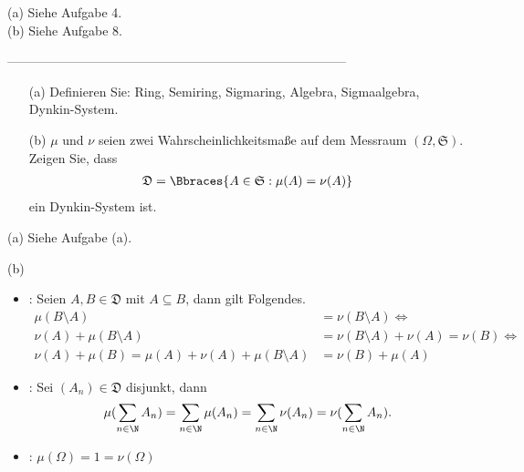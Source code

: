 \begin{solution}

(a) Siehe Aufgabe 4. \\

(b) Siehe Aufgabe 8.

\end{solution}

--------------------------------------------------------------------------------

\begin{exercise}

\begin{itemize}
  \item[(a)] Definieren Sie: Ring, Semiring, Sigmaring, Algebra, Sigmaalgebra, Dynkin-System.
  \item[(b)] $\mu$ und $\nu$ seien zwei Wahrscheinlichkeitsmaße auf dem Messraum $(\Omega, \mathfrak{S})$. Zeigen Sie, dass
  \begin{align*}
    \mathfrak{D} = \Bbraces{A \in \mathfrak{S} : \mu(A) = \nu(A)}
  \end{align*}
  ein Dynkin-System ist.
\end{itemize}

\end{exercise}

\begin{solution}

(a) Siehe Aufgabe (a).

(b)

\begin{itemize}

  \item {}: Seien $A, B \in \mathfrak{D}$ mit $A \subseteq B$, dann gilt Folgendes.
  \begin{align*}
    \mu(B \setminus A)
    & =
    \nu(B \setminus A)
    \Leftrightarrow \\
    \nu(A) + \mu(B \setminus A)
    & =
    \nu(B \setminus A) + \nu(A)
    =
    \nu(B)
    \Leftrightarrow \\
    \nu(A) + \mu(B)
    =
    \mu(A) + \nu(A) + \mu(B \setminus A)
    & =
    \nu(B) + \mu(A)
  \end{align*}

  \item {}: Sei $(A_n) \in \mathfrak{D}$ disjunkt, dann
  \begin{align*}
    \mu(\sum_{n \in \N} A_n)
    =
    \sum_{n \in \N} \mu(A_n)
    =
    \sum_{n \in \N} \nu(A_n)
    =
    \nu(\sum_{n \in \N} A_n).
  \end{align*}

  \item {}: $\mu(\Omega) = 1 = \nu(\Omega)$

\end{itemize}

\end{solution}
